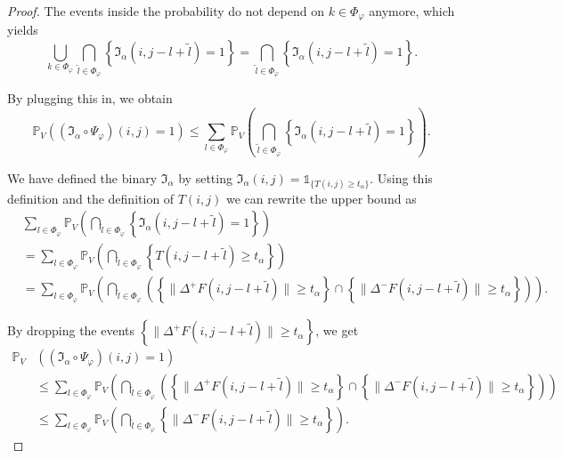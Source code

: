 \documentclass[a4paper,12pt]{article}
\newcommand{\norm}[1]{\lVert#1\rVert}
\theoremstyle{plain}
\theoremstyle{definition}
\begin{document}
\begin{proof}
	The events inside the probability do not depend on $k \in \Phi_\varphi$ anymore, which yields
	\begin{equation*}
		\bigcup_{k \in \Phi_\varphi} \bigcap_{\tilde{l} \in \Phi_\varphi} \left\{ \mathfrak{I}_\alpha(i, j - l + \tilde{l}) = 1 \right\} = \bigcap_{\tilde{l} \in \Phi_\varphi} \left\{ \mathfrak{I}_\alpha(i, j - l + \tilde{l}) = 1 \right\}.
	\end{equation*}
	
	By plugging this in, we obtain
	\begin{equation*}
		\mathbb{P}_V\left( (\mathfrak{I}_\alpha \circ \Psi_\varphi)(i, j) = 1 \right) \leq \sum_{l \in \Phi_\varphi} \mathbb{P}_V\left( \bigcap_{\tilde{l} \in \Phi_\varphi} \left\{ \mathfrak{I}_\alpha(i, j - l + \tilde{l}) = 1 \right\} \right).
	\end{equation*}
	
	We have defined the binary $\mathfrak{I}_\alpha$ by setting $\mathfrak{I}_\alpha(i, j) = \mathds{1}_{ \{ T(i, j) \geq t_\alpha \} }$. Using this definition and the definition of $T(i, j)$ we can rewrite the upper bound as
	\begin{align*}
		&\sum_{l \in \Phi_\varphi} \mathbb{P}_V\left( \bigcap_{\tilde{l} \in \Phi_\varphi} \left\{ \mathfrak{I}_\alpha(i, j - l + \tilde{l}) = 1 \right\} \right) \\
		&= \sum_{l \in \Phi_\varphi} \mathbb{P}_V\left( \bigcap_{\tilde{l} \in \Phi_\varphi} \left\{ T(i, j - l + \tilde{l}) \geq t_\alpha \right\} \right) \\
		&= \sum_{l \in \Phi_\varphi} \mathbb{P}_V\left( \bigcap_{\tilde{l} \in \Phi_\varphi} \left( \left\{ \norm{\Delta^+ F(i, j - l + \tilde{l})} \geq t_\alpha \right\} \cap \left\{ \norm{\Delta^- F(i, j - l + \tilde{l})} \geq t_\alpha \right\} \right) \right).
	\end{align*}
	
	By dropping the events $\left\{ \norm{\Delta^+ F(i, j - l + \tilde{l})} \geq t_\alpha \right\}$, we get
	\begin{align*}
		\mathbb{P}_V&\left( (\mathfrak{I}_\alpha \circ \Psi_\varphi)(i, j) = 1 \right) \\
		&\leq \sum_{l \in \Phi_\varphi} \mathbb{P}_V\left( \bigcap_{\tilde{l} \in \Phi_\varphi} \left( \left\{ \norm{\Delta^+ F(i, j - l + \tilde{l})} \geq t_\alpha \right\} \cap \left\{ \norm{\Delta^- F(i, j - l + \tilde{l})} \geq t_\alpha \right\} \right) \right) \\
		&\leq \sum_{l \in \Phi_\varphi} \mathbb{P}_V\left( \bigcap_{\tilde{l} \in \Phi_\varphi} \left\{ \norm{\Delta^- F(i, j - l + \tilde{l})} \geq t_\alpha \right\} \right).
	\end{align*}
	

\end{proof}
\end{document}
